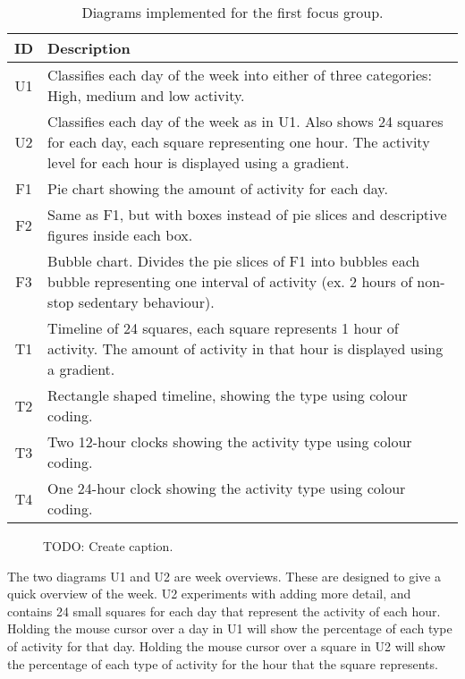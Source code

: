 \begin{table}[h!]
  \begin{center}
  \begin{tabular}{|c|p{10cm}|}
    \hline
    \textbf{ID} & \textbf{Description} \\ \hline
    U1 & Classifies each day of the week into either of three categories: High, medium and low activity. \\ \hline
    U2 & Classifies each day of the week as in U1. Also shows 24 squares for each day, each square representing one hour. The activity level for each hour is displayed using a gradient. \\ \hline
    F1 & Pie chart showing the amount of activity for each day. \\ \hline
    F2 & Same as F1, but with boxes instead of pie slices and descriptive figures inside each box. \\ \hline
    F3 & Bubble chart. Divides the pie slices of F1 into bubbles each bubble representing one interval of activity (ex. 2 hours of non-stop sedentary behaviour). \\ \hline
    T1 & Timeline of 24 squares, each square represents 1 hour of activity. The amount of activity in that hour is displayed using a gradient. \\ \hline
    T2 & Rectangle shaped timeline, showing the type using colour coding. \\ \hline
    T3 & Two 12-hour clocks showing the activity type using colour coding. \\ \hline
    T4 & One 24-hour clock showing the activity type using colour coding. \\ \hline
  \end{tabular}
  \end{center}
  \caption{Diagrams implemented for the first focus group.}
  \label{tab:runProtDesc1}
\end{table}

\begin{figure}
  \begin{center}
  \end{center}
  \caption{TODO: Create caption.}
  \label{fig:runProt1}
\end{figure}

The two diagrams U1 and U2 are week overviews. These are designed to give a quick overview of the week. U2 experiments with adding more detail, and contains 24 small squares for each day that represent the activity of each hour. Holding the mouse cursor over a day in U1 will show the percentage of each type of activity for that day. Holding the mouse cursor over a square in U2 will show the percentage of each type of activity for the hour that the square represents.

